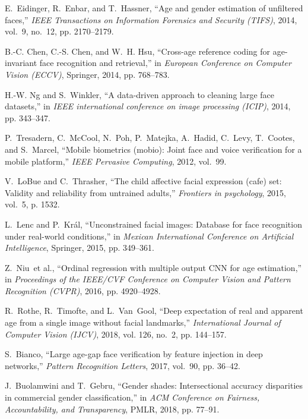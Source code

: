 \documentclass[journal]{IEEEtran}
\begin{document}
\begin{thebibliography}{100}
E.~Eidinger, R.~Enbar, and T.~Hassner, ``Age and gender estimation of unfiltered faces,'' \emph{IEEE Transactions on Information Forensics and Security (TIFS)}, 2014, vol.~9, no.~12, pp. 2170--2179.

B.-C. Chen, C.-S. Chen, and W.~H. Hsu, ``Cross-age reference coding for age-invariant face recognition and retrieval,'' in \emph{European Conference on Computer Vision (ECCV)}, Springer, 2014, pp. 768--783.

H.-W. Ng and S.~Winkler, ``A data-driven approach to cleaning large face datasets,'' in \emph{IEEE international conference on image processing
(ICIP)}, 2014, pp. 343--347.

P.~Tresadern, C.~McCool, N.~Poh, P.~Matejka, A.~Hadid, C.~Levy, T.~Cootes, and S.~Marcel, ``Mobile biometrics (mobio): Joint face and voice verification for
a mobile platform,'' \emph{IEEE Pervasive Computing}, 2012, vol.~99.

V.~LoBue and C.~Thrasher, ``The child affective facial expression (cafe) set: Validity and reliability from untrained adults,'' \emph{Frontiers in
psychology}, 2015, vol.~5, p. 1532.

L.~Lenc and P.~Kr{\'a}l, ``Unconstrained facial images: Database for face recognition under real-world conditions,'' in \emph{Mexican International
Conference on Artificial Intelligence}, Springer, 2015, pp. 349--361.

Z.~Niu~et al., ``Ordinal regression with multiple output {CNN} for age estimation,'' in \emph{Proceedings of the IEEE/CVF Conference on Computer Vision and Pattern Recognition (CVPR)}, 2016, pp. 4920--4928.

R.~Rothe, R.~Timofte, and L.~Van~Gool, ``Deep expectation of real and apparent age from a single image without facial landmarks,'' \emph{International Journal of Computer Vision (IJCV)}, 2018, vol. 126, no.~2, pp. 144--157.

S.~Bianco, ``Large age-gap face verification by feature injection in deep networks,'' \emph{Pattern Recognition Letters}, 2017, vol.~90, pp. 36--42.

J.~Buolamwini and T.~Gebru, ``Gender shades: Intersectional accuracy disparities in commercial gender classification,'' in \emph{ACM Conference on Fairness, Accountability, and Transparency}, PMLR, 2018, pp. 77--91.


\end{thebibliography}
\end{document}
